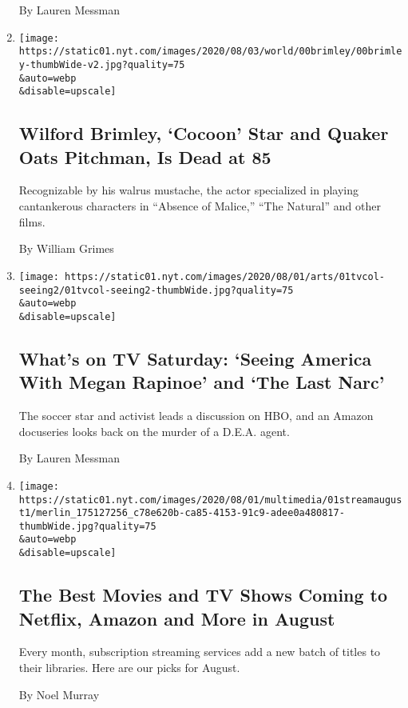\begin{enumerate}
  By Lauren Messman
\item
  \href{/2020/08/01/obituaries/wilford-brimley-dead.html}{}

  \texttt{[image: https://static01.nyt.com/images/2020/08/03/world/00brimley/00brimley-thumbWide-v2.jpg?quality=75\\\&auto=webp\\\&disable=upscale]}

  \hypertarget{wilford-brimley-cocoon-star-and-quaker-oats-pitchman-is-dead-at-85}{%
  \subsection{Wilford Brimley, `Cocoon' Star and Quaker Oats Pitchman,
  Is Dead at
  85}\label{wilford-brimley-cocoon-star-and-quaker-oats-pitchman-is-dead-at-85}}

  Recognizable by his walrus mustache, the actor specialized in playing
  cantankerous characters in ``Absence of Malice,'' ``The Natural'' and
  other films.

  By William Grimes
\item
  \href{/2020/08/01/arts/television/whats-on-tv-saturday-seeing-america-with-megan-rapinoe-and-the-last-narc.html}{}

  \texttt{[image: https://static01.nyt.com/images/2020/08/01/arts/01tvcol-seeing2/01tvcol-seeing2-thumbWide.jpg?quality=75\\\&auto=webp\\\&disable=upscale]}

  \hypertarget{whats-on-tv-saturday-seeing-america-with-megan-rapinoe-and-the-last-narc}{%
  \subsection{What's on TV Saturday: `Seeing America With Megan Rapinoe'
  and `The Last
  Narc'}\label{whats-on-tv-saturday-seeing-america-with-megan-rapinoe-and-the-last-narc}}

  The soccer star and activist leads a discussion on HBO, and an Amazon
  docuseries looks back on the murder of a D.E.A. agent.

  By Lauren Messman
\item
  \href{/2020/07/31/arts/television/new-to-stream-netflix.html}{}

  \texttt{[image: https://static01.nyt.com/images/2020/08/01/multimedia/01streamaugust1/merlin\_175127256\_c78e620b-ca85-4153-91c9-adee0a480817-thumbWide.jpg?quality=75\\\&auto=webp\\\&disable=upscale]}

  \hypertarget{the-best-movies-and-tv-shows-coming-to-netflix-amazon-and-more-in-august}{%
  \subsection{The Best Movies and TV Shows Coming to Netflix, Amazon and
  More in
  August}\label{the-best-movies-and-tv-shows-coming-to-netflix-amazon-and-more-in-august}}

  Every month, subscription streaming services add a new batch of titles
  to their libraries. Here are our picks for August.

  By Noel Murray
\end{enumerate}

